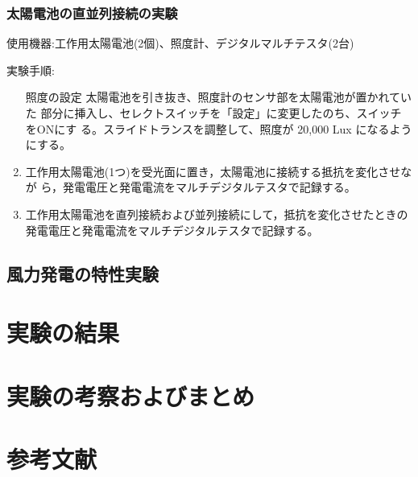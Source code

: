 \documentclass[a4paper,11pt,xelatex,ja=standard]{bxjsarticle}
\begin{document}
        \subsubsection{太陽電池の直並列接続の実験}
            使用機器:工作用太陽電池(2個)、照度計、デジタルマルチテスタ(2台)

            実験手順:

            \begin{enumerate}
                \item [照度の設定]太陽電池を引き抜き、照度計のセンサ部を太陽電池が置かれていた 部分に挿入し、セレクトスイッチを「設定」に変更したのち、スイッチをONにす る。スライドトランスを調整して、照度が 20,000 Lux になるようにする。
                \item 工作用太陽電池(1つ)を受光面に置き，太陽電池に接続する抵抗を変化させなが ら，発電電圧と発電電流をマルチデジタルテスタで記録する。
                \item 工作用太陽電池を直列接続および並列接続にして，抵抗を変化させたときの発電電圧と発電電流をマルチデジタルテスタで記録する。
            \end{enumerate}


    \subsection{風力発電の特性実験}



\section{実験の結果}
\section{実験の考察およびまとめ}
\section{参考文献}
\end{document}
